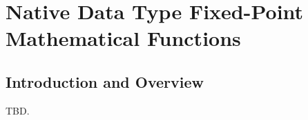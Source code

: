 \chapter{Native Data Type Fixed-Point Mathematical Functions}
\label{cfpa1}

\section{Introduction and Overview}
\label{cfpa1:siov0}

TBD.

